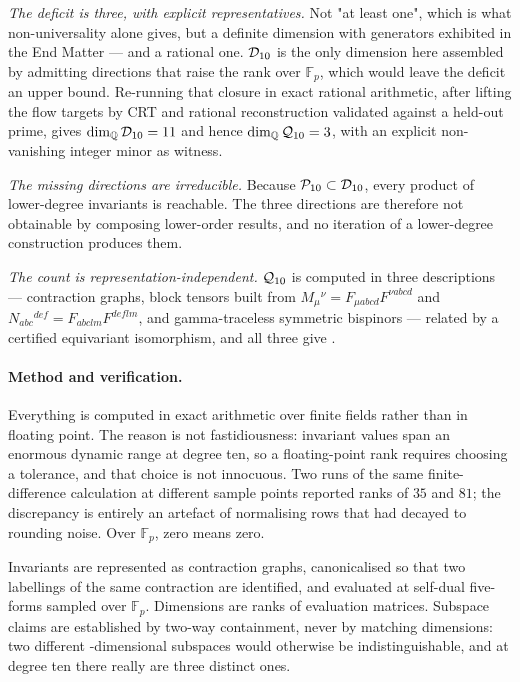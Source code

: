 \documentclass[aps,prl,reprint,superscriptaddress,nofootinbib,floatfix]{revtex4-2}
\begin{document}
\emph{The deficit is three, with explicit representatives.} Not "at least one",
which is what non-universality alone gives, but a definite dimension with
generators exhibited in the End Matter --- and a rational one. $\mathcal{D}_{10}$ is the
only dimension here assembled by admitting directions that raise the rank over
$\mathbb{F}_p$, which would leave the deficit an upper bound. Re-running that
closure in exact rational arithmetic, after lifting the flow targets by CRT and
rational reconstruction validated against a held-out prime, gives
$\dim_{\mathbb{Q}}\mathcal{D}_{10} = 11$ and hence
$\dim_{\mathbb{Q}}\mathcal{Q}_{10} = 3$, with an explicit
non-vanishing integer minor as witness.

\emph{The missing directions are irreducible.} Because $\mathcal{P}_{10}\subset\mathcal{D}_{10}$, every
product of lower-degree invariants is reachable. The three directions are
therefore not obtainable by composing lower-order results, and no iteration of a
lower-degree construction produces them.

\emph{The count is representation-independent.} $\mathcal{Q}_{10}$ is computed in three
descriptions --- contraction graphs, block tensors built from
$M_\mu{}^\nu = F_{\mu abcd}F^{\nu abcd}$ and
$N_{abc}{}^{def} = F_{abclm}F^{deflm}$, and gamma-traceless symmetric
bispinors --- related by a certified equivariant isomorphism, and all three give
\dimQten.

\paragraph*{Method and verification.}
Everything is computed in exact arithmetic over finite fields rather than in
floating point. The reason is not fastidiousness: invariant values span an
enormous dynamic range at degree ten, so a floating-point rank requires choosing
a tolerance, and that choice is not innocuous. Two runs of the same
finite-difference calculation at different sample points reported ranks of $35$
and $81$; the discrepancy is entirely an artefact of normalising rows that had
decayed to rounding noise. Over $\mathbb{F}_p$, zero means zero.

Invariants are represented as contraction graphs, canonicalised so that two
labellings of the same contraction are identified, and evaluated at self-dual
five-forms sampled over $\mathbb{F}_p$. Dimensions are ranks of evaluation
matrices. Subspace claims are established by two-way containment, never by
matching dimensions: two different \dimBten-dimensional subspaces would otherwise
be indistinguishable, and at degree ten there really are three distinct ones.
\end{document}
